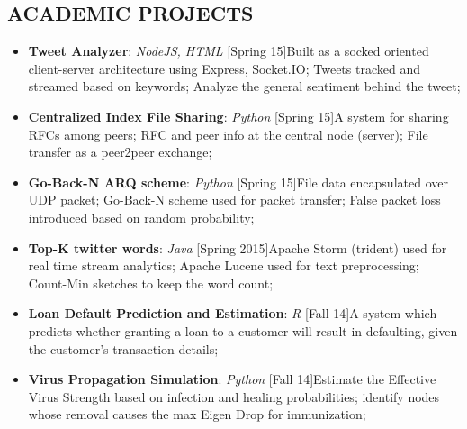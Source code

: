 \documentclass[11pt]{article}
\begin{document}
\begin{multicols}{2}
		\section*{ACADEMIC PROJECTS}
			\vspace{-0.1cm}
			\begin{itemize}[nolistsep,leftmargin=*]
				\item \textbf{Tweet Analyzer}: \textit{NodeJS, HTML} \hfill [Spring 15]\newline Built as a socked oriented client-server architecture using Express, Socket.IO; Tweets tracked and streamed based on keywords; Analyze the general sentiment behind the tweet;
				\item \textbf{Centralized Index File Sharing}: \textit{Python} \hfill [Spring 15]\newline A system for sharing RFCs among peers; RFC and peer info at the central node (server); File transfer as a peer2peer exchange; 
				\item \textbf{Go-Back-N ARQ scheme}: \textit{Python} \hfill [Spring 15]\newline File data encapsulated over UDP packet; Go-Back-N scheme used for packet transfer; False packet loss introduced based on random probability;
				\item \textbf{Top-K twitter words}: \textit{Java} \hfill [Spring 2015]\newline Apache Storm (trident) used for real time stream analytics; Apache Lucene used for text preprocessing; Count-Min sketches to keep the word count;
				\item \textbf{Loan Default Prediction and Estimation}: \textit{R} \hfill[Fall 14]\newline A system which predicts whether granting a loan to a customer will result in defaulting, given the customer's transaction details; 
				\item \textbf{Virus Propagation Simulation}: \textit{Python} \hfill [Fall 14]\newline Estimate the Effective Virus Strength based on infection and healing probabilities; identify nodes whose removal causes the max Eigen Drop for immunization;

\end{itemize}
\end{multicols}
\end{document}
